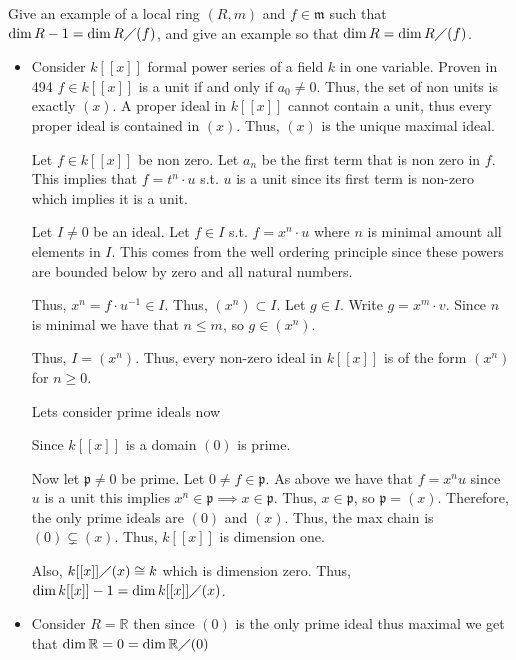 \documentclass[12pt, letterpaper]{article}
\newcommand{\R}{\mathbb{R}}
\newcommand{\p}{\mathfrak{p}}
\newcommand{\mf}[1]{\mathfrak{#1}}
\begin{document}
\begin{subproblem}{}
    Give an example of a local ring $(R, m)$ and $f \in \mf{m}$ such that $\dim R - 1 = \dim R \diagup (f)$,
and give an example so that $\dim R = \dim R \diagup (f )$.
\end{subproblem}
\begin{problemproof}
    \begin{itemize}
        \item Consider $k[[x]]$ formal power series of a field $k$ in one variable. Proven in 494 $f \in k[[x]]$ is a unit if and only if $a_0 \neq 0$.
        Thus, the set of non units is exactly $(x)$. A proper ideal in $k[[x]]$ cannot contain a unit, thus every proper ideal is contained in $(x)$. Thus, $(x)$ is the unique maximal ideal.

        Let $f \in k[[x]]$ be non zero. Let $a_n$ be the first term that is non zero in $f$. This implies that $f=t^n \cdot u$ s.t. $u$ is a unit since its first term is non-zero which implies it is a unit.

        Let $I \neq 0$ be an ideal. Let $f \in I$ s.t. $f=x^n \cdot u$ where $n$ is minimal amount all elements in $I$. This comes from the well ordering principle since these powers are bounded below by zero and all natural numbers.

        Thus, $x^n = f \cdot u^{-1} \in I$. Thus, $(x^n) \subset I$.
        Let $g \in I$. Write $g=x^m \cdot v$. Since $n$ is minimal we have that $n \leq m$, so $g \in (x^n)$.

        Thus, $I=(x^n)$. Thus, every non-zero ideal in $k[[x]]$ is of the form $(x^n)$ for $n \geq 0$.

        Lets consider prime ideals now
       
        Since $k[[x]]$ is a domain $(0)$ is prime.

        Now let $\p \neq 0$ be prime. Let $0 \neq f \in \p$. As above we have that $f=x^n u$ since $u$ is a unit this implies $x^n \in \p \implies x \in \p$. Thus, $x \in \p$, so $\p = (x)$. Therefore,
        the only prime ideals are $(0)$ and $(x)$. Thus, the max chain is $(0) \subsetneq (x)$. Thus, $k[[x]]$ is dimension one.

        Also, $k[[x]] \diagup (x) \cong k$ which is dimension zero. Thus, $\dim k[[x]] - 1 = \dim k[[x]] \diagup (x)$.
        \item Consider $R=\R$ then since $(0)$ is the only prime ideal thus maximal we get that $\dim \R = 0 = \dim \R \diagup (0)$
    \end{itemize}
\end{problemproof}
\end{document}
